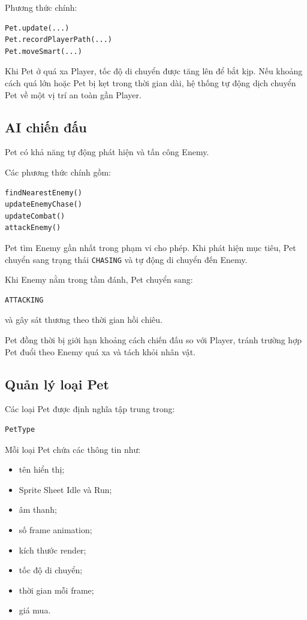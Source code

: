 \documentclass[12pt,a4paper]{report}
\begin{document}
    Phương thức chính:

    \begin{verbatim}
Pet.update(...)
Pet.recordPlayerPath(...)
Pet.moveSmart(...)
    \end{verbatim}

    Khi Pet ở quá xa Player, tốc độ di chuyển được tăng lên để bắt kịp.
    Nếu khoảng cách quá lớn hoặc Pet bị kẹt trong thời gian dài,
    hệ thống tự động dịch chuyển Pet về một vị trí an toàn gần Player.

    \subsection{AI chiến đấu}

    Pet có khả năng tự động phát hiện và tấn công Enemy.

    Các phương thức chính gồm:

    \begin{verbatim}
findNearestEnemy()
updateEnemyChase()
updateCombat()
attackEnemy()
    \end{verbatim}

    Pet tìm Enemy gần nhất trong phạm vi cho phép. Khi phát hiện mục
    tiêu, Pet chuyển sang trạng thái \texttt{CHASING} và tự động
    di chuyển đến Enemy.

    Khi Enemy nằm trong tầm đánh, Pet chuyển sang:

    \begin{verbatim}
ATTACKING
    \end{verbatim}

    và gây sát thương theo thời gian hồi chiêu.

    Pet đồng thời bị giới hạn khoảng cách chiến đấu so với Player,
    tránh trường hợp Pet đuổi theo Enemy quá xa và tách khỏi nhân vật.

    \subsection{Quản lý loại Pet}

    Các loại Pet được định nghĩa tập trung trong:

    \begin{verbatim}
PetType
    \end{verbatim}

    Mỗi loại Pet chứa các thông tin như:

    \begin{itemize}
        \item tên hiển thị;
        \item Sprite Sheet Idle và Run;
        \item âm thanh;
        \item số frame animation;
        \item kích thước render;
        \item tốc độ di chuyển;
        \item thời gian mỗi frame;
        \item giá mua.
    \end{itemize}
\end{document}
